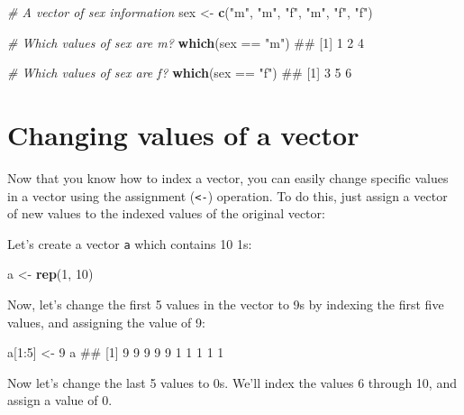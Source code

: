 \documentclass[]{book}
\newenvironment{Shaded}{\begin{snugshade}}{\end{snugshade}}
\newcommand{\KeywordTok}[1]{\textcolor[rgb]{0.13,0.29,0.53}{\textbf{{#1}}}}
\newcommand{\DecValTok}[1]{\textcolor[rgb]{0.00,0.00,0.81}{{#1}}}
\newcommand{\StringTok}[1]{\textcolor[rgb]{0.31,0.60,0.02}{{#1}}}
\newcommand{\CommentTok}[1]{\textcolor[rgb]{0.56,0.35,0.01}{\textit{{#1}}}}
\newcommand{\NormalTok}[1]{{#1}}
\theoremstyle{definition}
\theoremstyle{definition}
\theoremstyle{remark}
\begin{document}
\begin{Shaded}
\begin{Highlighting}[]
\CommentTok{# A vector of sex information}
\NormalTok{sex <-}\StringTok{ }\KeywordTok{c}\NormalTok{(}\StringTok{"m"}\NormalTok{, }\StringTok{"m"}\NormalTok{, }\StringTok{"f"}\NormalTok{, }\StringTok{"m"}\NormalTok{, }\StringTok{"f"}\NormalTok{, }\StringTok{"f"}\NormalTok{)}

\CommentTok{# Which values of sex are m?}
\KeywordTok{which}\NormalTok{(sex ==}\StringTok{ "m"}\NormalTok{)}
\NormalTok{## [1] 1 2 4}

\CommentTok{# Which values of sex are f?}
\KeywordTok{which}\NormalTok{(sex ==}\StringTok{ "f"}\NormalTok{)}
\NormalTok{## [1] 3 5 6}
\end{Highlighting}
\end{Shaded}

\section{Changing values of a vector}\label{changing-values-of-a-vector}

Now that you know how to index a vector, you can easily change specific
values in a vector using the assignment (\texttt{\textless{}-})
operation. To do this, just assign a vector of new values to the indexed
values of the original vector:

Let's create a vector \texttt{a} which contains 10 1s:

\begin{Shaded}
\begin{Highlighting}[]
\NormalTok{a <-}\StringTok{ }\KeywordTok{rep}\NormalTok{(}\DecValTok{1}\NormalTok{, }\DecValTok{10}\NormalTok{)}
\end{Highlighting}
\end{Shaded}

Now, let's change the first 5 values in the vector to 9s by indexing the
first five values, and assigning the value of 9:

\begin{Shaded}
\begin{Highlighting}[]
\NormalTok{a[}\DecValTok{1}\NormalTok{:}\DecValTok{5}\NormalTok{] <-}\StringTok{ }\DecValTok{9}
\NormalTok{a}
\NormalTok{##  [1] 9 9 9 9 9 1 1 1 1 1}
\end{Highlighting}
\end{Shaded}

Now let's change the last 5 values to 0s. We'll index the values 6
through 10, and assign a value of 0.
\end{document}
